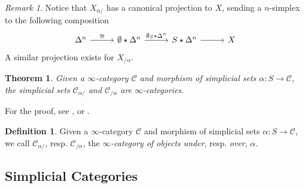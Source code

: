 \documentclass[a4paper]{book}
\newcommand{\lC}{\mathcal{C}}
\newtheorem{theorem}[equation]{Theorem}
\theoremstyle{definition}
\newtheorem{definition}[equation]{Definition}
\theoremstyle{remark}
\newtheorem{remark}[equation]{Remark}
\numberwithin{equation}{section}
\begin{document}
\begin{remark}
	Notice that $X_{\alpha/}$ has a canonical projection to $X$, sending a $n$-simplex to the following composition \begin{equation}
		\begin{tikzcd}[column sep=1cm]
			\Delta^n \arrow[r,"\cong"] & \emptyset\star\Delta^n \arrow[r,"\emptyset_S\star\Delta^n"] & S\star\Delta^n \arrow[r] & X
		\end{tikzcd}
	\end{equation}A similar projection exists for $X_{/\alpha}$. 
\end{remark}
\begin{theorem}
	Given a $\infty$-category $\lC$ and morphism of simplicial sets $\alpha:S\to\lC$, the simplicial sets $\lC_{\alpha/}$ and $\lC_{/\alpha}$ are $\infty$-categories. 
\end{theorem}For the proof, see \cite[Corollary 2.1.2.2]{lurie2009htt}, or \cite[Corollary 1.4.24]{land2021introduction}.
\begin{definition}
	Given a $\infty$-category $\lC$ and morphism of simplicial sets $\alpha:S\to\lC$, we call $\lC_{\alpha/}$, resp. $\lC_{/\alpha}$, the \emph{$\infty$-category of objects under}, resp. \emph{over}, $\alpha$. 
\end{definition}

\subsection{Simplicial Categories}
\end{document}
